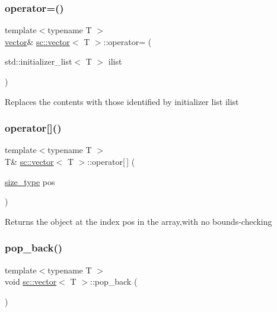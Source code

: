 \subsubsection{\texorpdfstring{operator=()}{operator=()}\hspace{0.1cm}{\footnotesize\ttfamily [2/2]}}
{\footnotesize\ttfamily template$<$typename T $>$ \\
\hyperlink{classsc_1_1vector}{vector}\& \hyperlink{classsc_1_1vector}{sc\+::vector}$<$ T $>$\+::operator= (\begin{DoxyParamCaption}\item[{std\+::initializer\+\_\+list$<$ T $>$}]{ilist }\end{DoxyParamCaption})\hspace{0.3cm}{\ttfamily [inline]}}

Replaces the contents with those identified by initializer list ilist \mbox{\label{classsc_1_1vector_ab93846461528695f38e1d143231b0653}} 
\subsubsection{\texorpdfstring{operator[]()}{operator[]()}}
{\footnotesize\ttfamily template$<$typename T $>$ \\
T\& \hyperlink{classsc_1_1vector}{sc\+::vector}$<$ T $>$\+::operator\mbox{[}$\,$\mbox{]} (\begin{DoxyParamCaption}\item[{\hyperlink{classsc_1_1vector_a48bf37ba1a6d0c13504414d86e27c399}{size\+\_\+type}}]{pos }\end{DoxyParamCaption})\hspace{0.3cm}{\ttfamily [inline]}}

Returns the object at the index pos in the array,with no bounds-\/checking \mbox{\label{classsc_1_1vector_a3dbc8155ac3737f9a9ffe7f454a8f321}} 
\subsubsection{\texorpdfstring{pop\+\_\+back()}{pop\_back()}}
{\footnotesize\ttfamily template$<$typename T $>$ \\
void \hyperlink{classsc_1_1vector}{sc\+::vector}$<$ T $>$\+::pop\+\_\+back (\begin{DoxyParamCaption}{ }\end{DoxyParamCaption})\hspace{0.3cm}{\ttfamily [inline]}}

